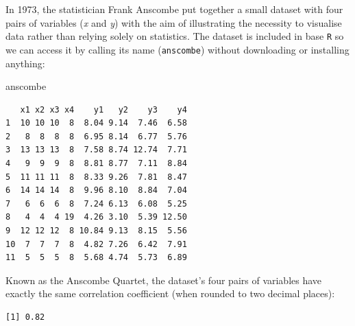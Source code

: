 \documentclass[
  letterpaper,
  DIV=11,
  numbers=noendperiod]{scrreprt}
\newenvironment{Shaded}{\begin{snugshade}}{\end{snugshade}}
\newcommand{\DecValTok}[1]{\textcolor[rgb]{0.68,0.00,0.00}{#1}}
\newcommand{\FunctionTok}[1]{\textcolor[rgb]{0.28,0.35,0.67}{#1}}
\newcommand{\NormalTok}[1]{\textcolor[rgb]{0.00,0.23,0.31}{#1}}
\newcommand{\SpecialCharTok}[1]{\textcolor[rgb]{0.37,0.37,0.37}{#1}}
\begin{document}
In 1973, the statistician Frank Anscombe put together a small dataset
with four pairs of variables (\emph{x} and \emph{y}) with the aim of
illustrating the necessity to visualise data rather than relying solely
on statistics. The dataset is included in base \texttt{R} so we can
access it by calling its name (\texttt{anscombe}) without downloading or
installing anything:

\begin{Shaded}
\begin{Highlighting}[]
\NormalTok{anscombe}
\end{Highlighting}
\end{Shaded}

\begin{verbatim}
   x1 x2 x3 x4    y1   y2    y3    y4
1  10 10 10  8  8.04 9.14  7.46  6.58
2   8  8  8  8  6.95 8.14  6.77  5.76
3  13 13 13  8  7.58 8.74 12.74  7.71
4   9  9  9  8  8.81 8.77  7.11  8.84
5  11 11 11  8  8.33 9.26  7.81  8.47
6  14 14 14  8  9.96 8.10  8.84  7.04
7   6  6  6  8  7.24 6.13  6.08  5.25
8   4  4  4 19  4.26 3.10  5.39 12.50
9  12 12 12  8 10.84 9.13  8.15  5.56
10  7  7  7  8  4.82 7.26  6.42  7.91
11  5  5  5  8  5.68 4.74  5.73  6.89
\end{verbatim}

Known as the Anscombe Quartet, the dataset's four pairs of variables
have exactly the same correlation coefficient (when rounded to two
decimal places):

\begin{Shaded}
\end{Shaded}

\begin{verbatim}
[1] 0.82
\end{verbatim}

\begin{Shaded}
\end{Shaded}
\end{document}
